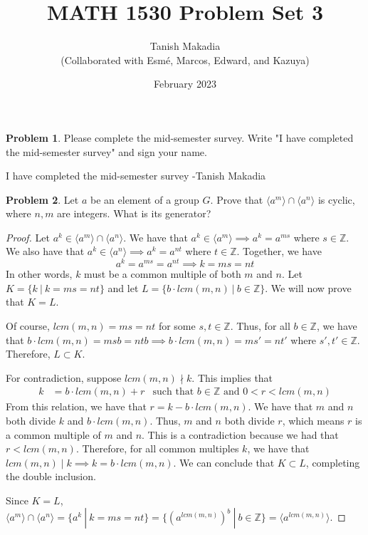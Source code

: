 \documentclass[12pt,reqno]{article}
\title{MATH 1530 Problem Set 3}
\author{Tanish Makadia\\\small{(Collaborated with Esmé, Marcos, Edward, and Kazuya)}}
\date{February 2023}
\newcommand{\Z}{\mathbb{Z}}
\theoremstyle{plain}
\theoremstyle{definition}
\newtheorem{problem}{Problem}
\begin{document}
\maketitle


\begin{problem}
    Please complete the mid-semester survey. Write "I have completed the mid-semester survey" and sign your name.
\end{problem}

I have completed the mid-semester survey -Tanish Makadia

\newpage


\begin{problem}
    Let \(a\) be an element of a group \(G\). Prove that \(\langle a^m\rangle \cap \langle a^n\rangle\)
    is cyclic, where \(n,m\) are integers. What is its generator?
\end{problem}

\begin{proof}
    Let \(a^k\in \langle a^m\rangle \cap \langle a^n\rangle\). We have that \(a^{k}\in\langle a^m\rangle\implies a^k=a^{ms}\) where \(s\in\Z\). 
    We also have that \(a^k\in\langle a^n\rangle\implies a^k=a^{nt}\) where \(t\in\Z\). Together, we have
    \[a^k=a^{ms}=a^{nt}\implies k=ms=nt\]
    In other words, \(k\) must be a common multiple of both \(m\) and \(n\). Let \(K = \{k\ |\ k=ms=nt\}\) and let \(L = \{b\cdot lcm(m,n)\ |\ b\in\Z\}\). We will now prove that \(K=L\).

    Of course, \(lcm(m,n)=ms=nt\) for some \(s,t\in\Z\). Thus, for all \(b\in\Z\), we have that \(b\cdot lcm(m,n)=msb=ntb\implies b\cdot lcm(m,n)=ms'=nt'\) where \(s',t'\in\Z\).
    Therefore, \(L\subset K\).

    For contradiction, suppose \(lcm(m,n)\nmid k\). This implies that
    \begin{align*}
        k&=b\cdot lcm(m,n) + r &\text{such that \(b\in\Z\) and \(0<r<lcm(m,n)\)}
    \end{align*}
    From this relation, we have that \(r = k - b\cdot lcm(m,n)\). We have that \(m\) and \(n\) both divide \(k\) and \(b\cdot lcm(m,n)\).
    Thus, \(m\) and \(n\) both divide \(r\), which means \(r\) is a common multiple of \(m\) and \(n\). This is a contradiction
    because we had that \(r<lcm(m,n)\). Therefore, for all common multiples \(k\), we have that \(lcm(m,n)\mid k\implies k=b\cdot lcm(m,n)\).
    We can conclude that \(K\subset L\), completing the double inclusion.
    
    Since \(K=L\), \(\langle a^m\rangle \cap \langle a^n\rangle=\{a^k\ |\ k=ms=nt\}=\{(a^{lcm(m,n)})^b\ |\ b\in\Z\}=\langle a^{lcm(m,n)}\rangle\). 
\end{proof}
\end{document}
